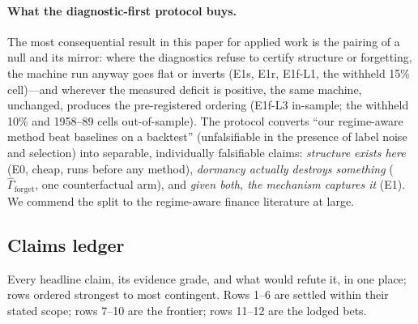 \documentclass{article}
\begin{document}
\paragraph{What the diagnostic-first protocol buys.} The most consequential
result in this paper for applied work is the pairing of a null and its
mirror: where the diagnostics refuse to certify structure or forgetting,
the machine run anyway goes flat or inverts (E1s, E1r, E1f-L1, the
withheld 15\% cell)---and wherever the measured deficit is positive,
the same machine, unchanged, produces the pre-registered ordering
(E1f-L3 in-sample; the withheld 10\% and 1958--89 cells
out-of-sample). The
protocol converts ``our regime-aware method beat baselines on a
backtest'' (unfalsifiable in the presence of label noise and selection)
into separable, individually falsifiable claims: \emph{structure exists
here} (E0, cheap, runs before any method), \emph{dormancy actually
destroys something} ($\hat\Gamma_{\mathrm{forget}}$, one counterfactual
arm), and \emph{given both, the mechanism captures it} (E1). We commend
the split to the regime-aware finance literature at large.

\subsection{Claims ledger}
\label{sec:ledger}

Every headline claim, its evidence grade, and what would refute it, in
one place; rows ordered strongest to most contingent. Rows 1--6 are
settled within their stated scope; rows 7--10 are the frontier; rows
11--12 are the lodged bets.
\end{document}
